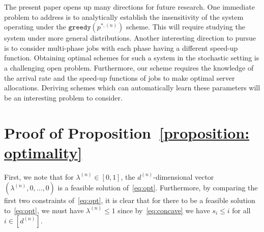 \documentclass[a4paper]{article}
\theoremstyle{plain}
\theoremstyle{definition}
\theoremstyle{case}
\theoremstyle{remark}
\begin{document}
The present paper opens up many directions for future research. One immediate problem to address is to analytically establish the insensitivity of the system operating under the $\texttt{greedy}(p^{*,(n)})$ scheme. This will require studying the system under more general distributions. Another interesting direction to pursue is to consider multi-phase jobs with each phase having a different speed-up function. Obtaining optimal schemes for such a system in the stochastic setting is a challenging open problem. Furthermore, our scheme requires the knowledge of the arrival rate and the speed-up functions of jobs to make optimal server allocations. Deriving schemes which can automatically learn these parameters will be an interesting problem to consider.
%


\appendix

\section{Proof of Proposition~\ref{proposition: optimality}}
\label{proof:optimality}
First, we note that for $\lambda^{(n)} \in [0,1]$, the $d^{(n)}$-dimensional vector $(\lambda^{(n)},0,\ldots,0)$ is a feasible solution of~\eqref{eq:opt}. Furthermore, by comparing the first two constraints of~\eqref{eq:opt}, it is clear that for there to be a feasible solution to~\eqref{eq:opt}, we must have $\lambda^{(n)} \leq 1$ since by~\eqref{eq:concave} we have $s_i \leq i$ for all $i \in [d^{(n)}]$.
\end{document}
